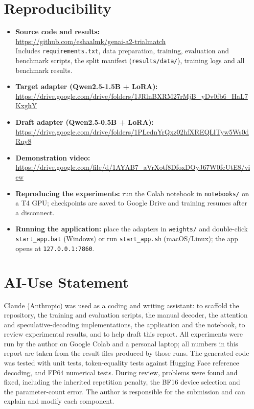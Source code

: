 \documentclass[conference]{IEEEtran}
\begin{document}
\section{Reproducibility}
{\renewcommand\UrlFont{\footnotesize\ttfamily}
\begin{itemize}
\item \textbf{Source code and results:}\\ \url{https://github.com/eshaalmk/genai-a2-trialmatch}\\
Includes \texttt{requirements.txt}, data preparation, training, evaluation and benchmark scripts, the split manifest (\texttt{results/data/}), training logs and all benchmark results.
\item \textbf{Target adapter (Qwen2.5-1.5B + LoRA):}\\ \url{https://drive.google.com/drive/folders/1JRlnBXRM27rMjB_yDv0fb6_HaL7KxghY}
\item \textbf{Draft adapter (Qwen2.5-0.5B + LoRA):}\\ \url{https://drive.google.com/drive/folders/1PLednYrQxz02hfXREQLlTyw5Ws0dRuy8}
\item \textbf{Demonstration video:}\\ \url{https://drive.google.com/file/d/1AYAB7_aVrXotf8DfoxDOyJ67W0fcUtE8/view}
\item \textbf{Reproducing the experiments:} run the Colab notebook in \texttt{notebooks/} on a T4 GPU; checkpoints are saved to Google Drive and training resumes after a disconnect.
\item \textbf{Running the application:} place the adapters in \texttt{weights/} and double-click \texttt{start\_app.bat} (Windows) or run \texttt{start\_app.sh} (macOS/Linux); the app opens at \texttt{127.0.0.1:7860}.
\end{itemize}}

\section{AI-Use Statement}
Claude (Anthropic) was used as a coding and writing assistant: to scaffold the repository, the training and evaluation scripts, the manual decoder, the attention and speculative-decoding implementations, the application and the notebook, to review experimental results, and to help draft this report. All experiments were run by the author on Google Colab and a personal laptop; all numbers in this report are taken from the result files produced by those runs. The generated code was tested with unit tests, token-equality tests against Hugging Face reference decoding, and FP64 numerical tests. During review, problems were found and fixed, including the inherited repetition penalty, the BF16 device selection and the parameter-count error. The author is responsible for the submission and can explain and modify each component.
\end{document}
